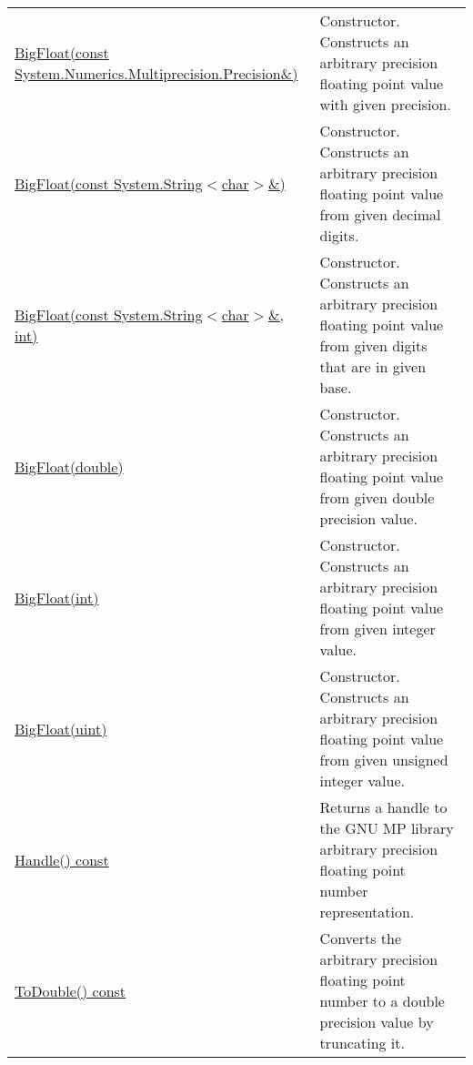 \documentclass[a4paper,oneside,11.000000pt]{book}
\begin{document}
\begin{flushleft}
\begin{supertabular}[l]{!{\raggedright}p{7.575cm}!{\raggedright}p{7.575cm}}
\\
\hyperlink{System.Numerics.Multiprecision.BigFloat.constructor.P.System.Numerics.Multiprecision.BigFloat.C.R.System.Numerics.Multiprecision.Precision}{BigFloat(const System.\-Numerics.\-Multiprecision.\-Precision\&\-)}
& Constructor. Constructs an arbitrary precision floating point value with given precision.

\\
\hyperlink{System.Numerics.Multiprecision.BigFloat.constructor.P.System.Numerics.Multiprecision.BigFloat.C.R.System.String.char}{BigFloat(const System.\-String$<$\-char$>$\-\&\-)}
& Constructor. Constructs an arbitrary precision floating point value from given decimal digits.

\\
\hyperlink{System.Numerics.Multiprecision.BigFloat.constructor.P.System.Numerics.Multiprecision.BigFloat.C.R.System.String.char.int}{BigFloat(const System.\-String$<$\-char$>$\-\&\-, int)}
& Constructor. Constructs an arbitrary precision floating point value from given digits that are in given base.

\\
\hyperlink{System.Numerics.Multiprecision.BigFloat.constructor.P.System.Numerics.Multiprecision.BigFloat.double}{BigFloat(double)}
& Constructor. Constructs an arbitrary precision floating point value from given double precision value.

\\
\hyperlink{System.Numerics.Multiprecision.BigFloat.constructor.P.System.Numerics.Multiprecision.BigFloat.int}{BigFloat(int)}
& Constructor. Constructs an arbitrary precision floating point value from given integer value.

\\
\hyperlink{System.Numerics.Multiprecision.BigFloat.constructor.P.System.Numerics.Multiprecision.BigFloat.uint}{BigFloat(uint)}
& Constructor. Constructs an arbitrary precision floating point value from given unsigned integer value.

\\
\hyperlink{System.Numerics.Multiprecision.BigFloat.Handle.C.P.System.Numerics.Multiprecision.BigFloat}{Handle() const}
& Returns a handle to the GNU MP library arbitrary precision floating point number representation.

\\
\hyperlink{System.Numerics.Multiprecision.BigFloat.ToDouble.C.P.System.Numerics.Multiprecision.BigFloat}{ToDouble() const}
& Converts the arbitrary precision floating point number to a double precision value by truncating it.


\end{supertabular}
\end{flushleft}
\end{document}
